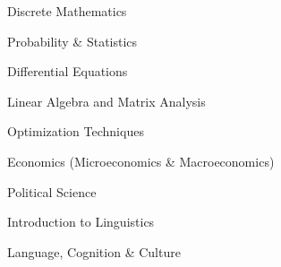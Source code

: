 \begin{multicols}{3}
	\skiplocation
	\begin{tightemize}
		\item Discrete Mathematics
		\item Probability \& Statistics
		\item Differential Equations
		\item Linear Algebra and Matrix Analysis
		\item Optimization Techniques
	\end{tightemize}
	
	
	\skiplocation
	\begin{tightemize}
		\item Economics (Microeconomics \& Macroeconomics)
		\item Political Science
		\item Introduction to Linguistics
		\item Language, Cognition \& Culture 
	\end{tightemize}
	
	
	
\end{multicols}
